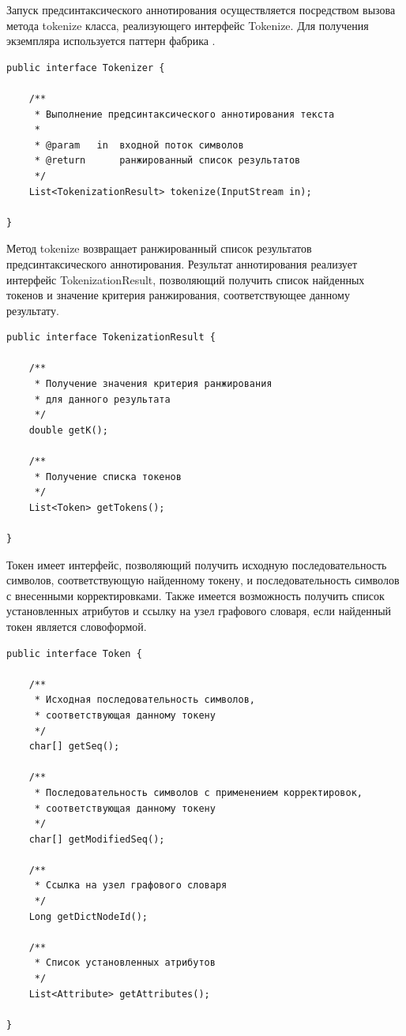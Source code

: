 Запуск предсинтаксического аннотирования осуществляется посредством вызова метода tokenize класса, реализующего интерфейс Tokenize. Для получения экземпляра используется паттерн фабрика \cite{gof}.
\begin{lstlisting}[caption={Интерфейс модуля предсинтаксического аннотирования}]
public interface Tokenizer {

    /**
     * Выполнение предсинтаксического аннотирования текста
     *
     * @param   in  входной поток символов
     * @return      ранжированный список результатов
     */
    List<TokenizationResult> tokenize(InputStream in);

}
\end{lstlisting}
Метод tokenize возвращает ранжированный список результатов предсинтаксического аннотирования. Результат аннотирования реализует интерфейс TokenizationResult, позволяющий получить список найденных токенов и значение критерия ранжирования, соответствующее данному результату.
\begin{lstlisting}[caption={Интерфейс результата аннотирования}]
public interface TokenizationResult {

    /**
     * Получение значения критерия ранжирования 
     * для данного результата
     */
    double getK();

    /**
     * Получение списка токенов
     */
    List<Token> getTokens();

}
\end{lstlisting}
Токен имеет интерфейс, позволяющий получить исходную последовательность символов, соответствующую найденному токену, и последовательность символов с внесенными корректировками. Также имеется возможность получить список установленных атрибутов и ссылку на узел графового словаря, если найденный токен является словоформой.
\begin{lstlisting}[caption={Интерфейс токена}]
public interface Token {

    /**
     * Исходная последовательность символов,
     * соответствующая данному токену
     */
    char[] getSeq();

    /**
     * Последовательность символов с применением корректировок,
     * соответствующая данному токену
     */
    char[] getModifiedSeq();

    /**
     * Ссылка на узел графового словаря
     */
    Long getDictNodeId();

    /**
     * Список установленных атрибутов
     */
    List<Attribute> getAttributes();

}
\end{lstlisting}